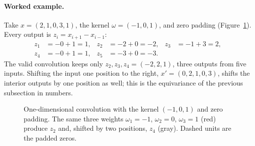 \paragraph{Worked example.}
Take $x = (2,1,0,3,1)$, the kernel $\omega = (-1,0,1)$, and zero padding
(Figure~\ref{fig:conv1d}). Every output is $z_i = x_{i+1} - x_{i-1}$:
\begin{align*}
  z_1 &= -0 + 1 = 1, & z_2 &= -2 + 0 = -2, & z_3 &= -1 + 3 = 2, \\
  z_4 &= -0 + 1 = 1, & z_5 &= -3 + 0 = -3 . &&
\end{align*}
\noindent
The valid convolution keeps only $z_2,z_3,z_4 = (-2,2,1)$, three outputs from
five inputs. Shifting the input one position to the right, $x' = (0,2,1,0,3)$,
shifts the interior outputs by one position as well; this is the equivariance of
the previous subsection in numbers.

\begin{figure}[ht]
  \centering
  \caption{One-dimensional convolution with the kernel $(-1,0,1)$ and zero
  padding. The same three weights $\omega_1=-1$, $\omega_2=0$, $\omega_3=1$
  (red) produce $z_2$ and, shifted by two
  positions, $z_4$ (gray). Dashed units are the padded zeros.}
  \label{fig:conv1d}
\end{figure}

